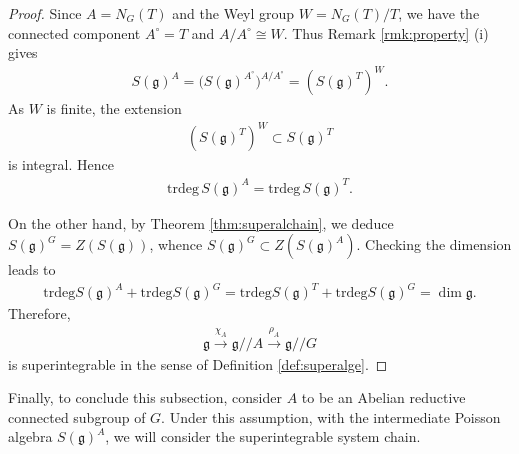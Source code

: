 \documentclass[11pt,reqno]{amsart}
\newtheorem*{theorem A}{Main Theorem A}
\newtheorem*{theorem B}{Main Theorem B}
\newtheorem*{theorem C}{Main Theorem C}
\newtheorem*{theorem D}{Main Theorem D}
\theoremstyle{definition}
\theoremstyle{plain}
\theoremstyle{conclusion}
\begin{document}
\begin{proof}
 Since $A = N_G(T)$ and the Weyl group $W = N_G(T)/T$, we have the connected component $A^\circ = T$ and $A/A^\circ \cong W$. Thus Remark \ref{rmk:property} (i) gives \begin{align*}
S(\mathfrak{g})^A = \bigl(S(\mathfrak{g})^{A^\circ}\bigr)^{A/A^\circ} = \left(S(\mathfrak{g})^T\right)^W.
\end{align*} As $W$ is finite, the extension \begin{align*}
\left(S(\mathfrak{g})^T\right)^W \subset S(\mathfrak{g})^T
\end{align*} is integral. Hence \begin{align*}
\mathrm{trdeg} \, S(\mathfrak{g})^A = \mathrm{trdeg}\, S(\mathfrak{g})^T.
\end{align*} %

On the other hand, by Theorem \ref{thm:superalchain}, we deduce $S(\mathfrak{g})^G = Z \left(S(\mathfrak{g})\right)$, whence  $S(\mathfrak{g})^G\subset Z \left(S(\mathfrak{g})^A\right)$. Checking the dimension leads to \begin{align*}
\mathrm{trdeg}S(\mathfrak{g})^A+\mathrm{trdeg}S(\mathfrak{g})^G = \mathrm{trdeg}S(\mathfrak{g})^T+\mathrm{trdeg}S(\mathfrak{g})^G = \dim \mathfrak{g}.
\end{align*} %
Therefore,  \begin{align*}
\mathfrak{g} \xrightarrow{\chi_A} \mathfrak{g}//A \xrightarrow{\rho_A} \mathfrak{g}//G
\end{align*} is superintegrable in the sense of Definition \ref{def:superalge}.
\end{proof}

Finally, to conclude this subsection, consider $A$ to be an Abelian reductive connected subgroup of $G$. Under this assumption, with the intermediate Poisson algebra $S(\mathfrak{g})^A$, we will consider the superintegrable system chain. 
\end{document}
